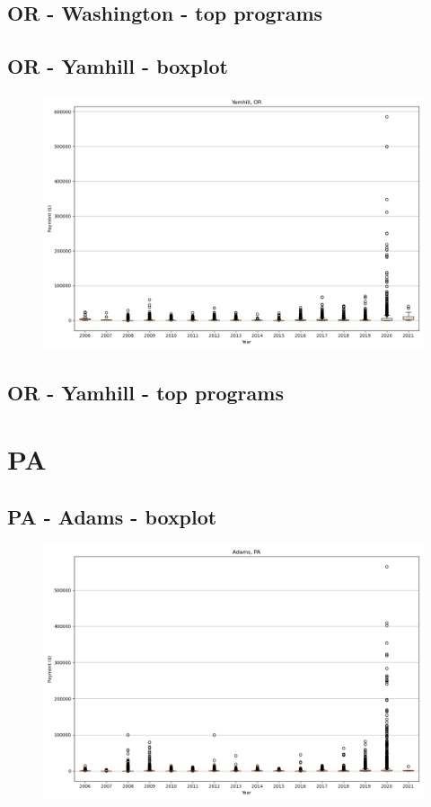 \subsection*{OR - Washington - top programs}

\newpage
\subsection*{OR - Yamhill - boxplot}
\begin{figure}[h]
\centering
\includegraphics[width=7in]{../output/boxplots/counties/Yamhill-OR_boxplot.png}
\end{figure}


\subsection*{OR - Yamhill - top programs}

\newpage
\section*{PA}
\subsection*{PA - Adams - boxplot}
\begin{figure}[h]
\centering
\includegraphics[width=7in]{../output/boxplots/counties/Adams-PA_boxplot.png}
\end{figure}


